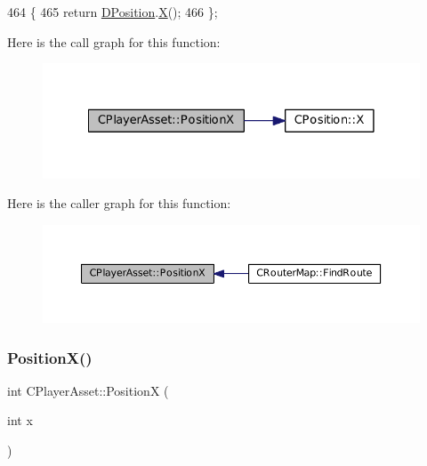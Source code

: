 \begin{DoxyCode}
464                              \{
465             \textcolor{keywordflow}{return} \hyperlink{classCPlayerAsset_aa9f53c009b181c7c5647c6b03776a04c}{DPosition}.\hyperlink{classCPosition_a9a6b94d3b91df1492d166d9964c865fc}{X}();  
466         \};
\end{DoxyCode}
Here is the call graph for this function\+:
\nopagebreak
\begin{figure}[H]
\begin{center}
\leavevmode
\includegraphics[width=328pt]{classCPlayerAsset_a9cf8961ac97f2928d1e08bc4f311f220_cgraph}
\end{center}
\end{figure}
Here is the caller graph for this function\+:
\nopagebreak
\begin{figure}[H]
\begin{center}
\leavevmode
\includegraphics[width=350pt]{classCPlayerAsset_a9cf8961ac97f2928d1e08bc4f311f220_icgraph}
\end{center}
\end{figure}
\hypertarget{classCPlayerAsset_a3b0981638b2e86e1ffb211365db26b41}{}\label{classCPlayerAsset_a3b0981638b2e86e1ffb211365db26b41} 
\subsubsection{\texorpdfstring{Position\+X()}{PositionX()}\hspace{0.1cm}{\footnotesize\ttfamily [2/2]}}
{\footnotesize\ttfamily int C\+Player\+Asset\+::\+PositionX (\begin{DoxyParamCaption}\item[{int}]{x }\end{DoxyParamCaption})}



